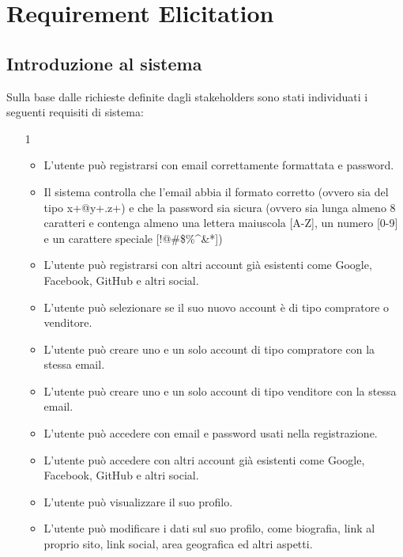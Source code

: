 
\chapter{Requirement Elicitation}
     \section{Introduzione al sistema} %
        Sulla base dalle richieste definite dagli stakeholders sono stati individuati i seguenti requisiti di sistema:
        
        \begin{itemize}
            \item[1]
                \begin{itemize}
                    \item L'utente può registrarsi con email correttamente formattata e password.
                    \item Il sistema controlla che l'email abbia il formato corretto (ovvero sia del tipo x+@y+.z+) e che la password sia sicura (ovvero sia lunga almeno 8 caratteri e contenga almeno una lettera maiuscola [A-Z], un numero [0-9] e un carattere speciale [!@\#\$\%\^{}\&*])
                    \item L'utente può registrarsi con altri account già esistenti come Google, Facebook, GitHub e altri social.
                    \item L'utente può selezionare se il suo nuovo account è di tipo compratore o venditore.
                    \item L'utente può creare uno e un solo account di tipo compratore con la stessa email.
                    \item L'utente può creare uno e un solo account di tipo venditore con la stessa email.
                    \item L'utente può accedere con email e password usati nella registrazione.
                    \item L'utente può accedere con altri account già esistenti come Google, Facebook, GitHub e altri social.
                    \item L'utente può visualizzare il suo profilo.
                    \item L'utente può modificare i dati sul suo profilo, come biografia, link al proprio sito, link social, area geografica ed altri aspetti.
                \end{itemize}

\end{itemize}
